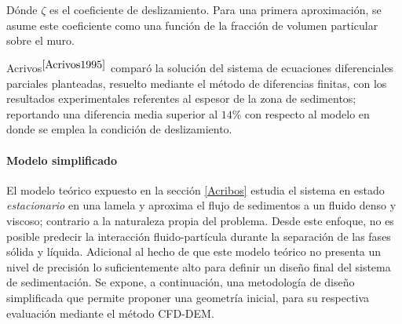 \noindent
\justify

D\'onde $\zeta$ es el coeficiente de deslizamiento. Para una primera aproximaci\'on, se asume este coeficiente como una funci\'on de la fracci\'on de volumen particular sobre el muro.

\noindent
\justify

Acrivos$^{\cite{Acrivos1995}}$ compar\'o la soluci\'on del sistema de ecuaciones diferenciales parciales planteadas, resuelto mediante el m\'etodo de diferencias finitas, con los resultados experimentales referentes al espesor de la zona de sedimentos; reportando una diferencia media superior al $14 \%$ con respecto al modelo en donde se emplea la condici\'on de deslizamiento.

\paragraph{Modelo simplificado} \label{simplificado}

\noindent
\justify

El modelo te\'orico expuesto en la secci\'on \ref{Acribos} estudia el sistema en estado \textit{estacionario} en una lamela y aproxima el flujo de sedimentos a un fluido denso y viscoso; contrario a la naturaleza propia del problema. Desde este enfoque, no es posible predecir la interacci\'on fluido-part\'icula durante la separaci\'on de las fases s\'olida y l\'iquida. Adicional al hecho de que este modelo te\'orico no presenta un nivel de precisi\'on lo suficientemente alto para definir un dise\~no final del sistema de sedimentaci\'on. Se expone, a continuaci\'on, una metodolog\'ia de dise\~no simplificada que permite proponer una geometr\'ia inicial, para su respectiva evaluaci\'on mediante el m\'etodo CFD-DEM.










